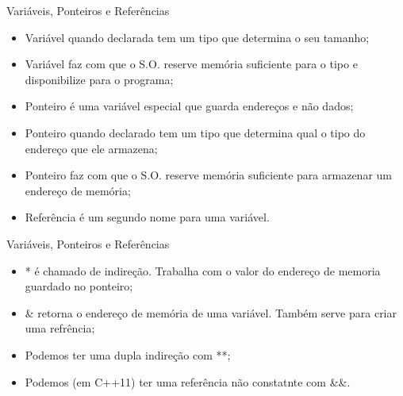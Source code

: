 \documentclass[12pt,table,xcolor={dvipsnames}]{beamer}
\begin{document}
\begin{frame}[fragile]{Variáveis, Ponteiros e Referências}
\begin{itemize}
\item Variável quando declarada tem um tipo que determina o seu tamanho;
\item Variável faz com que o S.O. reserve memória suficiente para o tipo e disponibilize para o programa;
\item Ponteiro é uma variável especial que guarda endereços e não dados;
\item Ponteiro quando declarado tem um tipo que determina qual o tipo do endereço que ele armazena;
\item Ponteiro faz com que o S.O. reserve memória suficiente para armazenar um endereço de memória;
\item Referência é um segundo nome para uma variável.
\end{itemize}
\end{frame}

\begin{frame}[fragile]{Variáveis, Ponteiros e Referências}
\begin{itemize}
\item * é chamado de indireção. Trabalha com o valor do endereço de memoria guardado no ponteiro;
\item \& retorna o endereço de memória de uma variável. Também serve para criar uma refrência;
\item Podemos ter uma dupla indireção com **;
\item Podemos (em C++11) ter uma referência não constatnte com \&\&.
\end{itemize}
\end{frame}
\end{document}
